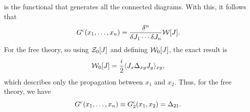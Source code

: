 is the functional that generates all the connected diagrams. With this, it follows that 
\begin{equation}
    G^{\mathrm{c}}(x_1,\dots,x_n) = \frac{\delta^n}{\delta J_1\cdots \delta J_n}\mathcal{W}[J].
\end{equation}
For the free theory, so using $\mathcal{Z}_0[J]$ and defining $\mathcal{W}_0[J]$, the exact result is 
\begin{equation}
    \mathcal{W}_0[J] = \frac{i}{2}\langle J_x\Delta_{xy}J_y \rangle_{xy},
\end{equation}
which describes only the propagation between $x_1$ and $x_2$. Thus, for the free theory, we have 
\begin{equation}
    G^{\mathrm{c}}(x_1,\dots,x_n) \equiv G_2^{\mathrm{c}}(x_1,x_2) = \Delta_{21}.
\end{equation}

